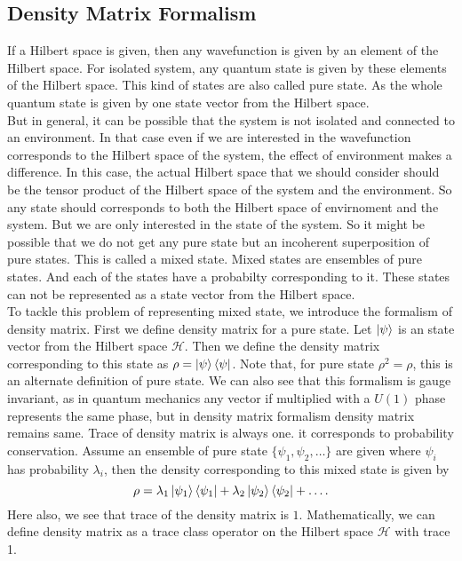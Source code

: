 \documentclass{scrartcl}
\begin{document}
\subsection{Density Matrix Formalism}
If a Hilbert space is given, then any wavefunction is given by an element of the Hilbert space. For isolated system, any quantum state is given by these elements of the Hilbert space. This kind of states are also called pure state. As the whole quantum state is given by one state vector from the Hilbert space.\\[0.3cm]
But in general, it can be possible that the system is not isolated and connected to an environment. In that case even if we are interested in the wavefunction corresponds to the Hilbert space of the system, the effect of environment makes a difference. In this case, the actual Hilbert space that we should consider should be the tensor product of the Hilbert space of the system and the environment. So any state should corresponds to both the Hilbert space of envirnoment and the system. But we are only interested in the state of the system. So it might be possible that we do not get any pure state but an incoherent superposition of pure states. This is called a mixed state. Mixed states are ensembles of pure states. And each of the states have a probabilty corresponding to it. These states can not be represented as a state vector from the Hilbert space.\\[0.3cm]
To tackle this problem of representing mixed state, we introduce the formalism of density matrix. First we define density matrix for a pure state. Let $\ket{\psi}$ is an state vector from the Hilbert space $\mathcal{H}$. Then we define the density matrix corresponding to this state as $\rho = \ket{\psi} \bra{\psi}$. Note that, for pure state $\rho^2 = \rho$, this is an alternate definition of pure state. We can also see that this formalism is gauge invariant, as in quantum mechanics any vector if multiplied with a $U(1)$ phase represents the same phase, but in density matrix formalism density matrix remains same. Trace of density matrix is always one. it corresponds to probability conservation. Assume an ensemble of pure state $\{\psi_1, \psi_2, \dots\}$ are given where $\psi_i$ has probability $\lambda_i$, then the density corresponding to this mixed state is given by 
\begin{equation*}
    \rho = \lambda_1 \ket{\psi_1}\bra{\psi_1} + \lambda_2\ket{\psi_2}\bra{\psi_2} + \dots.
\end{equation*}
Here also, we see that trace of the density matrix is $1$. Mathematically, we can define density matrix as a trace class operator on the Hilbert space $\mathcal{H}$ with trace 1.\\[0.3cm]
\end{document}
